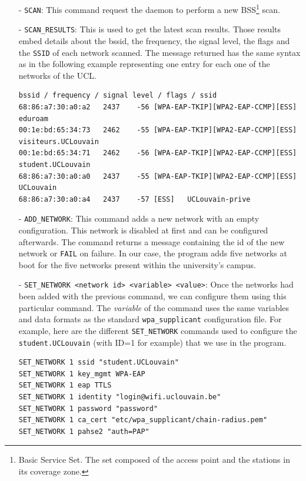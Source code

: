 \begin{itemize}
	\item[-] \texttt{SCAN}: This command request the daemon to perform a new BSS\footnote{Basic Service Set. The set composed of the access point and the stations in its coverage zone.} scan.

	\item[-] \texttt{SCAN\_RESULTS}: This is used to get the latest scan results. Those results embed details about the bssid, the frequency, the signal level, the flags and the \texttt{SSID} of each network scanned. The message returned has the same syntax as in the following example representing one entry for each one of the networks of the UCL.\\

\begin{lstlisting}[frame=single,breaklines=true,caption={Scan results message example}]
bssid / frequency / signal level / flags / ssid
68:86:a7:30:a0:a2	2437	-56	[WPA-EAP-TKIP][WPA2-EAP-CCMP][ESS]	eduroam
00:1e:bd:65:34:73	2462	-55	[WPA-EAP-TKIP][WPA2-EAP-CCMP][ESS]	visiteurs.UCLouvain
00:1e:bd:65:34:71 	2462	-56	[WPA-EAP-TKIP][WPA2-EAP-CCMP][ESS]	student.UCLouvain
68:86:a7:30:a0:a0 	2437	-55	[WPA-EAP-TKIP][WPA2-EAP-CCMP][ESS]	UCLouvain
68:86:a7:30:a0:a4 	2437	-57	[ESS]	UCLouvain-prive
\end{lstlisting}

	\item[-] \texttt{ADD\_NETWORK}: This command adds a new network with an empty configuration. This network is disabled at first and can be configured afterwards. The command returns a message containing the id of the new network or \texttt{FAIL} on failure. In our case, the program adds five networks at boot for the five networks present within the university's campus.

	\item[-] \texttt{SET\_NETWORK <network id> <variable> <value>}: Once the networks had been added with the previous command, we can configure them using this particular command. The \textit{variable} of the command uses the same variables and data formats as the standard \texttt{wpa\_supplicant} configuration file. For example, here are the different \texttt{SET\_NETWORK} commands used to configure the \texttt{student.UCLouvain} (with ID=1 for example) that we use in the program.\\

\begin{lstlisting}[frame=single,breaklines=true,caption={Configuration of the \texttt{student.UCLouvain} network}]
SET_NETWORK 1 ssid "student.UCLouvain"
SET_NETWORK 1 key_mgmt WPA-EAP
SET_NETWORK 1 eap TTLS
SET_NETWORK 1 identity "login@wifi.uclouvain.be"
SET_NETWORK 1 password "password"
SET_NETWORK 1 ca_cert "etc/wpa_supplicant/chain-radius.pem"
SET_NETWORK 1 pahse2 "auth=PAP"
\end{lstlisting}


\end{itemize}
